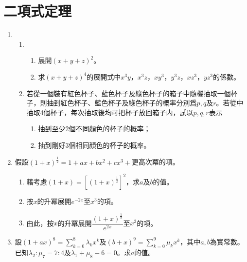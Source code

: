 \documentclass[12pt]{article}
\begin{document}
    \tableofcontents

    \newpage

    \section{二項式定理}

    \begin{enumerate}
        \item \begin{enumerate}
            \item \begin{enumerate}
                \item 展開$(x+y+z)^2$。
                \item 求$(x+y+z)^4$的展開式中$x^3y$，$x^3z$，$xy^3$，$y^3z$，$xz^3$，$yz^3$的係數。
            \end{enumerate}
            \item 若從一個裝有紅色杯子、藍色杯子及綠色杯子的箱子中隨機抽取一個杯子，則抽到紅色杯子、藍色杯子及綠色杯子的概率分別爲$p,q$及$r$。若從中抽取4個杯子，每次抽取後均可把杯子放回箱子内，試以$p,q,r$表示\begin{enumerate}
                \item 抽到至少2個不同顏色的杯子的概率；
                \item 抽到剛好3個相同顔色的杯子的概率。
            \end{enumerate}
        \end{enumerate}
        \item 假設$(1+x)^{\frac{1}{2}}=1+ax+bx^2+cx^3+$更高次冪的項。\begin{enumerate}
            \item 藉考慮$(1+x)=[(1+x)^{\frac{1}{2}}]^2$，求$a$及$b$的值。
            \item 按$x$的升冪展開$e^{-2x}$至$x^3$的項。
            \item 由此，按$x$的升冪展開$\dfrac{(1+x)^{\frac{1}{2}}}{e^{2x}}$至$x^3$的項。
        \end{enumerate}
        \item 設$(1+ax)^8=\sum_{k=0}^{8}\lambda_k x^k$及$(b+x)^9=\sum_{k=0}^{9}\mu_k x^k$，其中$a,b$為實常數。已知$\lambda_2:\mu_7=7:4$及$\lambda_1+\mu_8+6=0$。求$a$的值。
    \end{enumerate}
\end{document}

